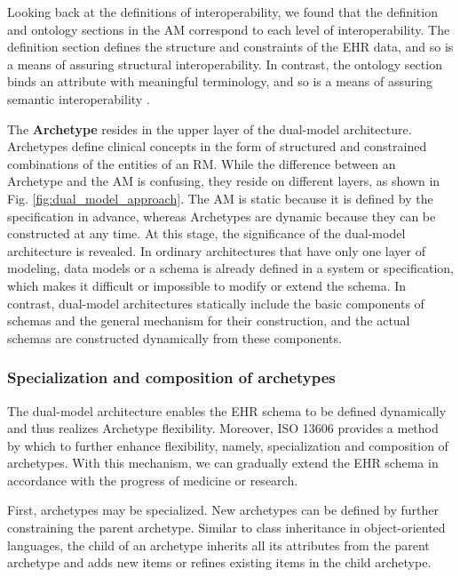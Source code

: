 \documentclass[preprint,3p,onecolumn,times,review]{elsarticle}
\begin{document}
Looking back at the definitions of interoperability, we found that the definition and ontology sections in the AM correspond to each level of interoperability.
The definition section defines the structure and constraints of the EHR data, and so is a means of assuring structural interoperability.
In contrast, the ontology section binds an attribute with meaningful terminology, and so is a means of assuring semantic interoperability \cite[p.586]{duftschmid10:_extrac_elect_healt_recor_entit}.

The {\bf Archetype} resides in the upper layer of the dual-model architecture.
Archetypes define clinical concepts in the form of structured and constrained combinations of the entities of an RM.
While the difference between an Archetype and the AM is confusing, they reside on different layers, as shown in Fig. \ref{fig:dual_model_approach}.
The AM is static because it is defined by the specification in advance, whereas Archetypes are dynamic because they can be constructed at any time.
At this stage, the significance of the dual-model architecture is revealed.
In ordinary architectures that have only one layer of modeling, data models or a schema is already defined in a system or specification, which makes it difficult or impossible to modify or extend the schema.
In contrast, dual-model architectures statically include the basic components of schemas and the general mechanism for their construction, and the actual schemas are constructed dynamically from these components.


\subsubsection{Specialization and composition of archetypes}

The dual-model architecture enables the EHR schema to be defined dynamically and thus realizes Archetype flexibility.
Moreover, ISO 13606 provides a method by which to further enhance flexibility, namely, specialization and composition of archetypes.
With this mechanism, we can gradually extend the EHR schema in accordance with the progress of medicine or research.

First, archetypes may be specialized. New archetypes can be defined by further constraining the parent archetype.
Similar to class inheritance in object-oriented languages, the child of an archetype inherits all its attributes from the parent archetype and adds new items or refines existing items in the child archetype.
\end{document}

